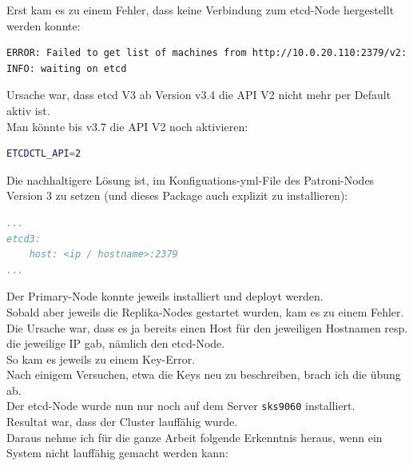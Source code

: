 \begin{flushleft}
    Erst kam es zu einem Fehler, dass keine Verbindung zum \gls{etcd}-Node hergestellt werden konnte:
\lstset{style=gra_codestyle}
\begin{lstlisting}[language=bash, caption=Patroni - etcd API V2 Error,captionpos=b,label={lst:patroni_etcd_api_v2_error},breaklines=true]
ERROR: Failed to get list of machines from http://10.0.20.110:2379/v2: EtcdException('Bad response : 404 page not found\n')
INFO: waiting on etcd
\end{lstlisting}
    Ursache war, dass \gls{etcd} V3 ab Version v3.4 die API V2 nicht mehr per Default aktiv ist.\\
    Man könnte bis v3.7 die API V2 noch aktivieren:
\lstset{style=gra_codestyle}
\begin{lstlisting}[language=bash, caption=Patroni - etcd API V2 Enable,captionpos=b,label={lst:patroni_etcd_api_v2_enable},breaklines=true]
ETCDCTL_API=2
\end{lstlisting}
    Die nachhaltigere Lösung ist, im Konfiguations-yml-File des Patroni-Nodes Version 3 zu setzen (und dieses Package auch explizit zu installieren):
\lstset{style=gra_codestyle}
\begin{lstlisting}[language=yaml, caption=Patroni - etcd3 Flag,captionpos=b,label={lst:patroni_etcd3_flag},breaklines=true]
...
etcd3:
    host: <ip / hostname>:2379
...
\end{lstlisting}
\end{flushleft}
\begin{flushleft}
    Der Primary-Node konnte jeweils installiert und deployt werden.\\
    Sobald aber jeweils die Replika-Nodes gestartet wurden, kam es zu einem Fehler.\\
    Die Ursache war, dass es ja bereits einen Host für den jeweiligen Hostnamen resp.
    die jeweilige IP gab, nämlich den \gls{etcd}-Node.\\
    So kam es jeweils zu einem Key-Error.\\
    Nach einigem Versuchen, etwa die Keys neu zu beschreiben, brach ich die übung ab.\\
    Der \gls{etcd}-Node wurde nun nur noch auf dem Server \texttt{sks9060} installiert.\\
    Resultat war, dass der Cluster lauffähig wurde.\\
    Daraus nehme ich für die ganze Arbeit folgende Erkenntnis heraus, wenn ein System nicht lauffähig gemacht werden kann:\\
\end{flushleft}
